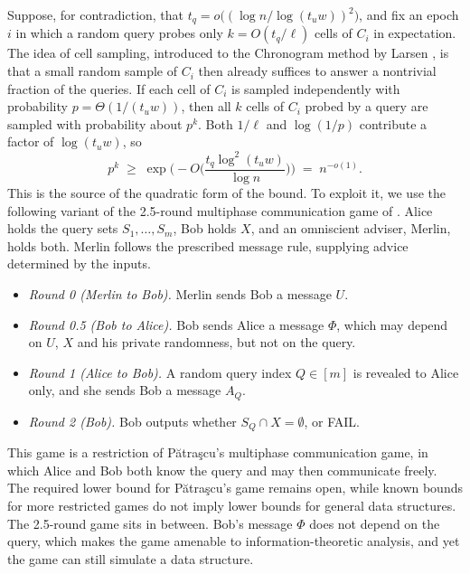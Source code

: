 \documentclass[11pt]{article}
\theoremstyle{plain}
\theoremstyle{definition}
\theoremstyle{remark}
\newcommand{\Patrascu}{P\u{a}tra\c{s}cu\xspace}
\begin{document}
Suppose, for contradiction, that $t_q = o\big((\log n/\log(t_u w))^2\big)$, and fix an epoch $i$ in which a random query probes only $k = O(t_q/\ell)$ cells of $C_i$ in expectation. The idea of cell sampling, introduced to the Chronogram method by Larsen \cite{larsen_cell_2012}, is that a small random sample of $C_i$ then already suffices to answer a nontrivial fraction of the queries. If each cell of $C_i$ is sampled independently with probability $p = \Theta(1/(t_u w))$, then all $k$ cells of $C_i$ probed by a query are sampled with probability about $p^k$. Both $1/\ell$ and $\log(1/p)$ contribute a factor of $\log(t_u w)$, so
\[ p^{k} \;\ge\; \exp\Big(-O\Big(\frac{t_q \log^2(t_u w)}{\log n}\Big)\Big) \;=\; n^{-o(1)}. \]
This is the source of the quadratic form of the bound. To exploit it, we use the following variant of the 2.5-round multiphase communication game of \cite{ko_omega_2026}. Alice holds the query sets $S_1, \dots, S_m$, Bob holds $X$, and an omniscient adviser, Merlin, holds both. Merlin follows the prescribed message rule, supplying advice determined by the inputs.
\begin{Protocol}
\begin{itemize}[leftmargin=*]
  \item \emph{Round 0 (Merlin to Bob).} Merlin sends Bob a message $U$.
  \item \emph{Round 0.5 (Bob to Alice).} Bob sends Alice a message $\Phi$, which may depend on $U$, $X$ and his private randomness, but not on the query.
  \item \emph{Round 1 (Alice to Bob).} A random query index $Q \in [m]$ is revealed to Alice only, and she sends Bob a message $A_Q$.
  \item \emph{Round 2 (Bob).} Bob outputs whether $S_Q \cap X = \emptyset$, or FAIL.
\end{itemize}
\caption{The 2.5-round multiphase communication game (cf.\ \cite[Protocol~3]{ko_omega_2026})\label{prot:game}}
\end{Protocol}
\noindent This game is a restriction of \Patrascu's multiphase communication game, in which Alice and Bob both know the query and may then communicate freely. The required lower bound for \Patrascu's game remains open, while known bounds for more restricted games \cite{chattopadhyay_upper_2016,ko_adaptive_2020,dvorak_lower_2020} do not imply lower bounds for general data structures. The 2.5-round game sits in between. Bob's message $\Phi$ does not depend on the query, which makes the game amenable to information-theoretic analysis, and yet the game can still simulate a data structure.
\end{document}
